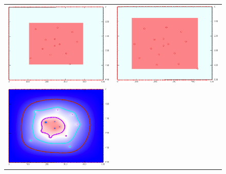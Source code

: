 \begin{refsection}
\begin{figure}
\centering
\begin{tabular}{cc}
\includegraphics[width=\breite]{green/images/resultate/grfl/step0144.png}
& \includegraphics[width=\breite]{green/images/resultate/grfl/step0175.png}\vspace{1cm}\\
\includegraphics[width=\breite]{green/images/resultate/cp/step0144.png}

\end{tabular}
\end{figure}
\end{refsection}
